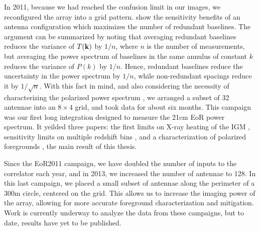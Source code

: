 In 2011, because we had reached the confusion limit in our images, we reconfigured the array into a
grid pattern. \citet{PAPERSensitivity} show the sensitivity benefits of an antenna configuration
which maximizes the number of redundant baselines. The argument can be summarized by noting that
averaging redundant baselines reduces the variance of $T(\mathbf{k})$ by $1/n$, where $n$ is the number of
measurements, but averaging the power spectrum of baselines in the same annulus of constant $k$
reduces the variance of $P(k)$ by $1/n$. Hence, redundant baselines reduce the uncertainty in the
power spectrum by $1/n$, while non-redundant spacings reduce it by $1/\sqrt{n}$. With this fact in
mind, and also considering the necessity of characterizing the polarized power spectrum
\cite{Moore2013}, we arranged a subset of 32 antennae into an $8\times4$ grid, and took data for
about six months. This campaign was our first long integration designed to measure the 21cm EoR
power spectrum. It yeilded three papers: the first limits on X-ray heating of the IGM
\cite[][Figure \ref{fig:parsons2014}]{Parsons2014}, sensitivity limits on multiple redshift bins \cite{Jacobs2014}, and a
characterization of polarized foregrounds \cite{Moore2014}, the main result of this thesis.

Since the EoR2011 campaign, we have doubled the number of inputs to the correlator each year, and in
2013, we increased the number of antennae to 128. In this last campaign, we placed a small subset of
antennae along the perimeter of a 300m circle, centered on the grid. This allows us to increase the
imaging power of the array, allowing for more accurate foreground characterization and mitigation. 
Work is currently underway to analyze the data from these campaigns, but to date, results have
yet to be published. 
